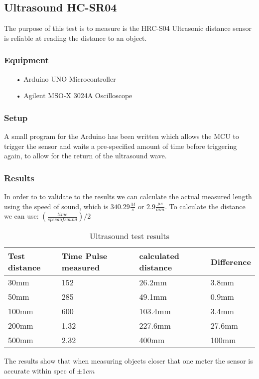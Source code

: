 \subsection{Ultrasound HC-SR04}
The purpose of this test is to measure is the HRC-S04 Ultrasonic distance sensor is reliable at reading the distance to an object.

\subsubsection{Equipment}

\begin{enumerate}
    \item[•]Arduino UNO Microcontroller
    \item[•]Agilent MSO-X 3024A Oscilloscope    
\end{enumerate}

\subsubsection{Setup}
A small program for the Arduino has been written which allows the MCU to trigger the sensor and waits a pre-specified amount of time before triggering again, to allow for the return of the ultrasound wave. 

\subsubsection{Results}
In order to to validate to the results we can calculate the actual measured length using the speed of sound, which is $ 340.29 \frac{M}{s} $ or $2.9\frac{\mu s}{mm}$. To calculate the distance we can use: $(\frac{time}{speed of sound})/2$ \cite{SOF}
\begin{table}[h]
\centering
\label{ultrasoundtestresults}
\begin{tabular}{|l|l|l|l|}
\hline
\textbf{Test distance} & \textbf{Time Pulse measured} & \textbf{calculated  distance} & \textbf{Difference} \\ \hline
30mm          & 152                 & 26.2mm               & 3.8mm      \\ \hline
50mm          & 285                 & 49.1mm               & 0.9mm      \\ \hline
100mm         & 600                 & 103.4mm              & 3.4mm      \\ \hline
200mm         & 1.32                & 227.6mm              & 27.6mm     \\ \hline
500mm         & 2.32                & 400mm                & 100mm      \\ \hline
\end{tabular}
\caption{Ultrasound test results}
\end{table}

The results show that when measuring objects closer that one meter the sensor is accurate within spec of $\pm 1cm$